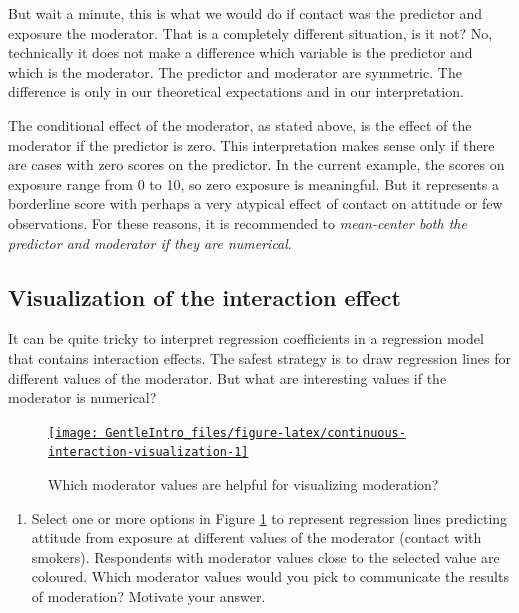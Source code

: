 \documentclass[a4paper]{book}
\providecommand{\tightlist}{%
  \setlength{\itemsep}{0pt}\setlength{\parskip}{0pt}}
\theoremstyle{definition}
\theoremstyle{definition}
\theoremstyle{definition}
\theoremstyle{remark}
\begin{document}
But wait a minute, this is what we would do if contact was the predictor
and exposure the moderator. That is a completely different situation, is
it not? No, technically it does not make a difference which variable is
the predictor and which is the moderator. The predictor and moderator
are symmetric. The difference is only in our theoretical expectations
and in our interpretation.

The conditional effect of the moderator, as stated above, is the effect
of the moderator if the predictor is zero. This interpretation makes
sense only if there are cases with zero scores on the predictor. In the
current example, the scores on exposure range from 0 to 10, so zero
exposure is meaningful. But it represents a borderline score with
perhaps a very atypical effect of contact on attitude or few
observations. For these reasons, it is recommended to \emph{mean-center
both the predictor and moderator if they are numerical}.

\subsection{Visualization of the interaction
effect}\label{visualization-of-the-interaction-effect}

It can be quite tricky to interpret regression coefficients in a
regression model that contains interaction effects. The safest strategy
is to draw regression lines for different values of the moderator. But
what are interesting values if the moderator is numerical?

\begin{figure}[H]
\href{http://82.196.4.233:3838/apps/continuous-interaction-visualization/}{\texttt{[image: GentleIntro\_files/figure-latex/continuous-interaction-visualization-1]} }\caption{Which moderator values are helpful for visualizing moderation?}\label{fig:continuous-interaction-visualization}
\end{figure}

\begin{enumerate}
\def\labelenumi{\arabic{enumi}.}
\tightlist
\item
  Select one or more options in Figure
  \ref{fig:continuous-interaction-visualization} to represent regression
  lines predicting attitude from exposure at different values of the
  moderator (contact with smokers). Respondents with moderator values
  close to the selected value are coloured. Which moderator values would
  you pick to communicate the results of moderation? Motivate your
  answer.
\end{enumerate}
\end{document}
